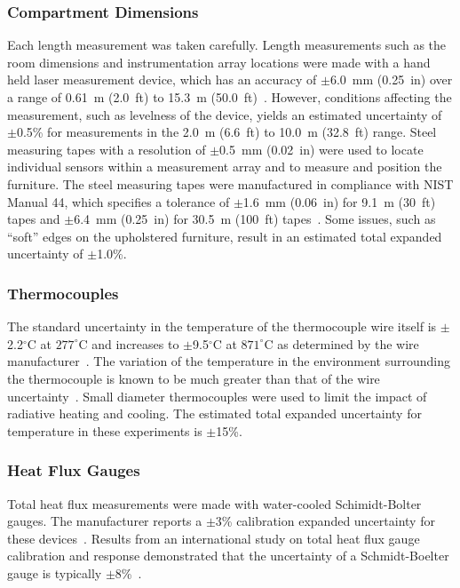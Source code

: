 \documentclass[12pt,oneside]{book}
\begin{document}
\subsubsection{Compartment Dimensions}
Each length measurement was taken carefully. Length measurements such as the room dimensions and instrumentation array locations were made with a hand held laser measurement device, which has an accuracy of $\pm$6.0~mm (0.25~in) over a range of 0.61~m (2.0~ft) to 15.3~m (50.0~ft)~\cite{StanleyTools}. However, conditions affecting the measurement, such as levelness of the device, yields an estimated uncertainty of $\pm$0.5\% for measurements in the 2.0~m (6.6~ft) to 10.0~m (32.8~ft) range. Steel measuring tapes with a resolution of $\pm$0.5~mm (0.02~in) were used to locate individual sensors within a measurement array and to measure and position the furniture. The steel measuring tapes were manufactured in compliance with NIST Manual 44, which specifies a tolerance of $\pm$1.6~mm (0.06~in) for 9.1~m (30~ft) tapes and $\pm$6.4~mm (0.25~in) for 30.5~m (100~ft) tapes~\cite{Butcher:2012}. Some issues, such as ``soft'' edges on the upholstered furniture, result in an estimated total expanded uncertainty of $\pm$1.0\%.

\subsubsection{Thermocouples}
The standard uncertainty in the temperature of the thermocouple wire itself is $\pm$2.2$^{\circ}$C at $277^{\circ}$C and increases to $\pm$9.5$^{\circ}$C at $871^{\circ}$C as determined by the wire manufacturer~\cite{Omega:2004}. The variation of the temperature in the environment surrounding the thermocouple is known to be much greater than that of the wire uncertainty~\cite{Blevins:1999,Pitts:2003}. Small diameter thermocouples were used to limit the impact of radiative heating and cooling. The estimated total expanded uncertainty for temperature in these experiments is $\pm$15\%.

\subsubsection{Heat Flux Gauges}
Total heat flux measurements were made with water-cooled Schimidt-Bolter gauges. The manufacturer reports a $\pm$3\% calibration expanded uncertainty for these devices~\cite{Medtherm:2003}. Results from an international study on total heat flux gauge calibration and response demonstrated that the uncertainty of a Schmidt-Boelter gauge is typically $\pm$8\%~\cite{Pitts:2006}.
\end{document}
